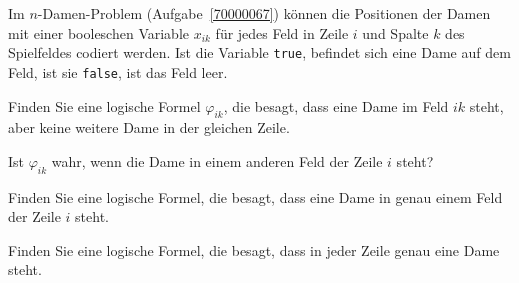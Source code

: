 Im $n$-Damen-Problem (Aufgabe~\ref{70000067}) können die Positionen
der Damen mit einer booleschen Variable $x_{ik}$ für jedes Feld 
in Zeile $i$ und Spalte $k$ des Spielfeldes codiert werden.
Ist die Variable \texttt{true}, befindet sich eine Dame auf dem
Feld, ist sie \texttt{false}, ist das Feld leer.
\begin{teilaufgaben}
\item
Finden Sie eine logische Formel $\varphi_{ik}$, die besagt, dass
eine Dame im Feld $ik$ steht, aber keine weitere Dame in der
gleichen Zeile.
\item
Ist $\varphi_{ik}$ wahr, wenn die Dame in einem anderen Feld der Zeile $i$
steht?
\item
Finden Sie eine logische Formel, die besagt, dass eine Dame in genau einem
Feld der Zeile $i$ steht.
\item
Finden Sie eine logische Formel, die besagt, dass in jeder Zeile genau
eine Dame steht.
\end{teilaufgaben}


